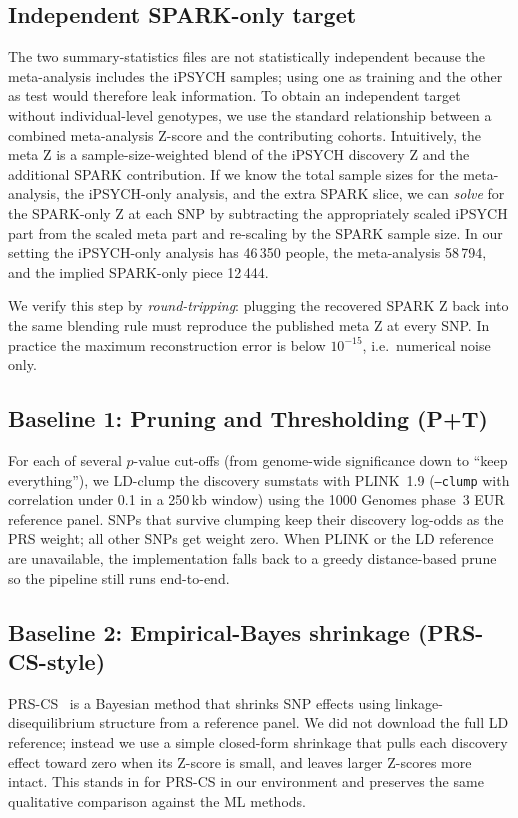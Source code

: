 \subsection{Independent SPARK-only target}
\label{sec:sparkz}

The two summary-statistics files are not statistically independent
because the meta-analysis includes the iPSYCH samples; using one as
training and the other as test would therefore leak information. To
obtain an independent target without individual-level genotypes, we use
the standard relationship between a combined meta-analysis Z-score and
the contributing cohorts. Intuitively, the meta Z is a
sample-size-weighted blend of the iPSYCH discovery Z and the
additional SPARK contribution. If we know the total sample sizes for
the meta-analysis, the iPSYCH-only analysis, and the extra SPARK
slice, we can \emph{solve} for the SPARK-only Z at each SNP by
subtracting the appropriately scaled iPSYCH part from the scaled meta
part and re-scaling by the SPARK sample size. In our setting the
iPSYCH-only analysis has 46\,350 people, the meta-analysis 58\,794, and
the implied SPARK-only piece 12\,444.

We verify this step by \emph{round-tripping}: plugging the recovered
SPARK Z back into the same blending rule must reproduce the published
meta Z at every SNP. In practice the maximum reconstruction error is
below $10^{-15}$, i.e.\ numerical noise only.

\subsection{Baseline 1: Pruning and Thresholding (P+T)}

For each of several $p$-value cut-offs (from genome-wide significance
down to ``keep everything''), we LD-clump the discovery sumstats with
PLINK~1.9 (\texttt{--clump} with correlation under 0.1 in a 250\,kb
window) using the 1000 Genomes phase~3 EUR reference panel. SNPs that
survive clumping keep their discovery log-odds as the PRS weight; all
other SNPs get weight zero. When PLINK or the LD reference are
unavailable, the implementation falls back to a greedy distance-based
prune so the pipeline still runs end-to-end.

\subsection{Baseline 2: Empirical-Bayes shrinkage (PRS-CS-style)}

PRS-CS~\cite{ge2019prscs} is a Bayesian method that shrinks SNP effects
using linkage-disequilibrium structure from a reference panel. We did
not download the full LD reference; instead we use a simple
closed-form shrinkage that pulls each discovery effect toward zero when
its Z-score is small, and leaves larger Z-scores more intact. This
stands in for PRS-CS in our environment and preserves the same
qualitative comparison against the ML methods.

